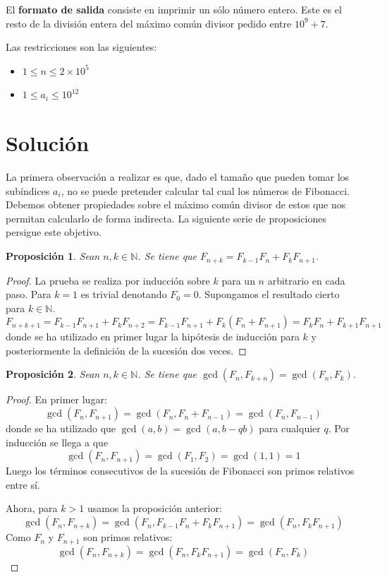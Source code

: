 \documentclass{article}
\theoremstyle{theorem-style}  %
\newtheorem{proposition}{Proposición}
\theoremstyle{definition}
\theoremstyle{example-style}
\begin{document}
    El \textbf{formato de salida} consiste en imprimir un sólo número entero. Este es el resto de la división entera del máximo común divisor pedido entre $10^9+7$.

    Las restricciones son las siguientes:
    \begin{itemize}
        \item $1 \leq n \leq 2 \times 10^5$
        \item $1 \leq a_i \leq 10^{12}$
    \end{itemize}

\section*{Solución}
    
    La primera observación a realizar es que, dado el tamaño que pueden tomar los subíndices $a_i$, no se puede pretender calcular tal cual los números de Fibonacci. Debemos obtener propiedades sobre el máximo común divisor de estos que nos permitan calcularlo de forma indirecta. La siguiente serie de proposiciones persigue este objetivo. 
    
    \begin{proposition}
        Sean $n, k \in \mathbb{N}$. Se tiene que $F_{n+k} = F_{k-1}F_n + F_k F_{n+1}$. 
    \end{proposition}
    \begin{proof}
        La prueba se realiza por inducción sobre $k$ para un $n$ arbitrario en cada paso. Para $k=1$ es trivial denotando $F_0 = 0$. Supongamos el resultado cierto para $k \in \mathbb{N}$. 
        $$ F_{n+k+1} = F_{k-1}F_{n+1} + F_k F_{n+2} = F_{k-1}F_{n+1} + F_k (F_{n} + F_{n+1}) = F_{k}F_n + F_{k+1} F_{n+1} $$
        donde se ha utilizado en primer lugar la hipótesis de inducción para $k$ y posteriormente la definición de la sucesión dos veces.
    \end{proof}
    
    \begin{proposition}
        Sean $n, k \in \mathbb{N}$. Se tiene que $\gcd(F_n, F_{k+n}) = \gcd(F_n, F_k)$. 
    \end{proposition}
    \begin{proof}
        En primer lugar: 
        $$ \gcd(F_n, F_{n+1}) = \gcd(F_{n}, F_{n}+F_{n-1}) = \gcd(F_{n}, F_{n-1}) $$
        donde se ha utilizado que $\gcd(a,b) = \gcd(a,b-qb)$ para cualquier $q$. Por inducción se llega a que 
        $$ \gcd(F_n, F_{n+1}) = \gcd(F_{1}, F_{2}) = \gcd(1,1) = 1 $$
        Luego los términos consecutivos de la sucesión de Fibonacci son primos relativos entre sí.
                
        Ahora, para $k > 1$ usamos la proposición anterior:
        $$ \gcd(F_n, F_{n+k}) = \gcd(F_n, F_{k-1}F_n + F_k F_{n+1}) = \gcd(F_n, F_k F_{n+1}) $$
        Como $F_n$ y $F_{n+1}$ son primos relativos:
        $$ \gcd(F_n, F_{n+k}) = \gcd(F_n, F_k F_{n+1}) = \gcd(F_n, F_k) $$
    \end{proof}
    
\end{document}
